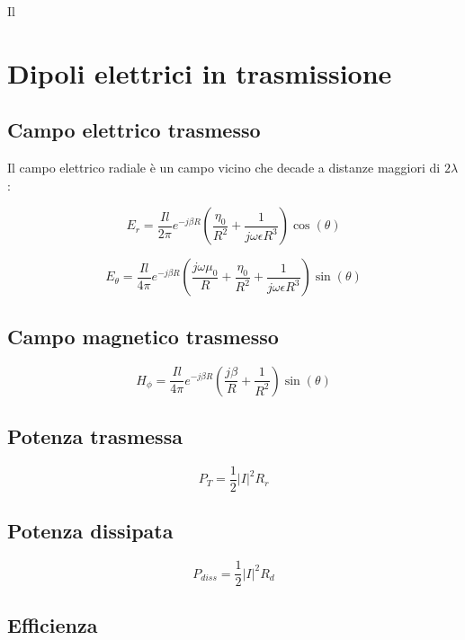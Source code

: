 \documentclass[10pt,a4paper]{report}
\begin{document}
	    Il
	 \section{Dipoli elettrici in trasmissione}

		\subsection{Campo elettrico trasmesso}

		Il campo elettrico radiale è un campo vicino che decade a distanze maggiori di $2\lambda$:
		
		\begin{equation}
		E_r=\frac{I{l}}{2\pi}e^{-j\beta R}(\frac{ \eta_0}{R^2}+\frac{1}{j \omega \epsilon R^3})\cos(\theta)
		\end{equation}
		
		\begin{equation}
		 E_{\theta} = \frac {Il} {4\pi} e^{-j\beta R} ( \frac {j\omega \mu_0} {R} + \frac {\eta_0} {R^2} + \frac {1}  {j \omega \epsilon R^3} ) \sin(\theta)
		\end{equation}

		\subsection{Campo magnetico trasmesso}

		\begin{equation}
		H_{\phi}=\frac{Il}{4\pi}e^{-j\beta R}(\frac{j \beta}{R}+\frac{1}{R^2})\sin(\theta)
		\end{equation}

		\subsection{Potenza trasmessa}

	  \begin{equation}
	  P_T=\frac{1}{2}|I|^2R_r
	  \end{equation}

	  	\subsection{Potenza dissipata}

	  \begin{equation}
	  P_{diss}=\frac{1}{2}|I|^2R_d
	  \end{equation}

	  \subsection{Efficienza}
\end{document}
